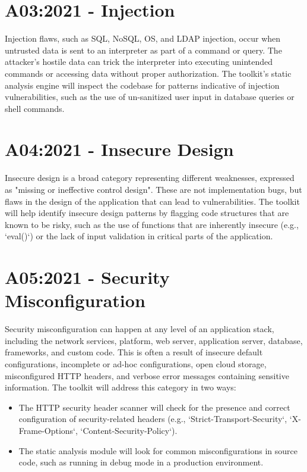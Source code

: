 \section{A03:2021 - Injection}
Injection flaws, such as SQL, NoSQL, OS, and LDAP injection, occur when untrusted data is sent to an interpreter as part of a command or query. The attacker's hostile data can trick the interpreter into executing unintended commands or accessing data without proper authorization.
The toolkit's static analysis engine will inspect the codebase for patterns indicative of injection vulnerabilities, such as the use of un-sanitized user input in database queries or shell commands.

\section{A04:2021 - Insecure Design}
Insecure design is a broad category representing different weaknesses, expressed as "missing or ineffective control design". These are not implementation bugs, but flaws in the design of the application that can lead to vulnerabilities.
The toolkit will help identify insecure design patterns by flagging code structures that are known to be risky, such as the use of functions that are inherently insecure (e.g., `eval()`) or the lack of input validation in critical parts of the application.

\section{A05:2021 - Security Misconfiguration}
Security misconfiguration can happen at any level of an application stack, including the network services, platform, web server, application server, database, frameworks, and custom code. This is often a result of insecure default configurations, incomplete or ad-hoc configurations, open cloud storage, misconfigured HTTP headers, and verbose error messages containing sensitive information.
The toolkit will address this category in two ways:
\begin{itemize}
    \item The HTTP security header scanner will check for the presence and correct configuration of security-related headers (e.g., `Strict-Transport-Security`, `X-Frame-Options`, `Content-Security-Policy`).
    \item The static analysis module will look for common misconfigurations in source code, such as running in debug mode in a production environment.
\end{itemize}

